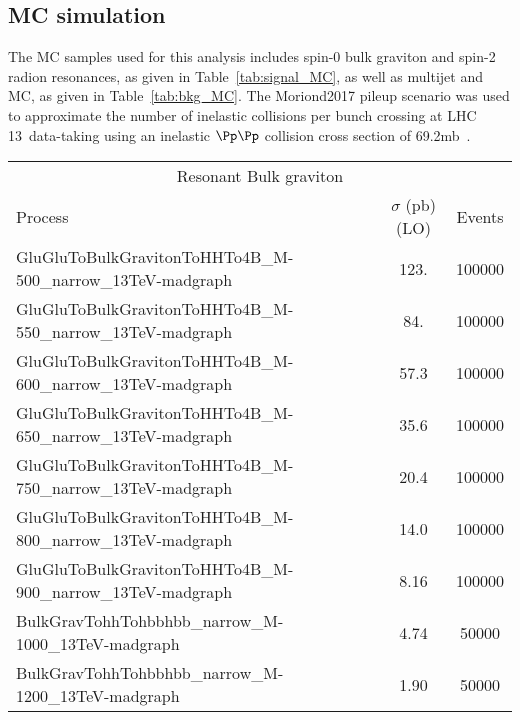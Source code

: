 \subsection{MC simulation\label{ss:MCSimulation}}

The MC samples used for this analysis includes spin-0 bulk graviton and spin-2 radion resonances,
as given in Table~\ref{tab:signal_MC}, as well as multijet and \ttbar MC, as given in Table~\ref{tab:bkg_MC}. The Moriond2017 pileup scenario was used to approximate the number of inelastic collisions per bunch crossing at LHC 13~\TeV data-taking using an inelastic $\Pp\Pp$ collision cross section of 69.2\unit{mb}~\cite{Aaboud:2016mmw}.

\begin{table}[htb]\footnotesize
  \begin{center}
    \begin{tabular}{l|c|c}
      \hline
      \hline
      \multicolumn{3}{c}{Resonant Bulk graviton} \\ \cline{1-3}
      Process & $\sigma$ (pb) (LO) & Events\\ \hline
      \hline
      {GluGluToBulkGravitonToHHTo4B\_M-500\_narrow\_13TeV-madgraph} & 123. & 100000 \\
      {GluGluToBulkGravitonToHHTo4B\_M-550\_narrow\_13TeV-madgraph} & 84. & 100000 \\
      {GluGluToBulkGravitonToHHTo4B\_M-600\_narrow\_13TeV-madgraph} & 57.3 & 100000 \\
      {GluGluToBulkGravitonToHHTo4B\_M-650\_narrow\_13TeV-madgraph} & 35.6 & 100000 \\
      {GluGluToBulkGravitonToHHTo4B\_M-750\_narrow\_13TeV-madgraph} & 20.4 & 100000 \\
      {GluGluToBulkGravitonToHHTo4B\_M-800\_narrow\_13TeV-madgraph} & 14.0 & 100000 \\
      {GluGluToBulkGravitonToHHTo4B\_M-900\_narrow\_13TeV-madgraph} & 8.16 & 100000 \\
      {BulkGravTohhTohbbhbb\_narrow\_M-1000\_13TeV-madgraph} & 4.74 &50000 \\
      {BulkGravTohhTohbbhbb\_narrow\_M-1200\_13TeV-madgraph} & 1.90 & 50000 \\

\end{tabular}
\end{center}
\end{table}
